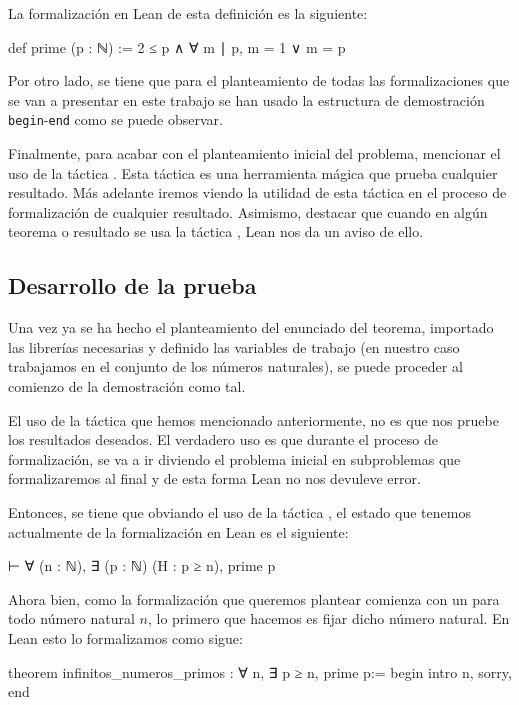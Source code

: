 La formalización en Lean de esta definición es la siguiente:
\begin{leancode}
def prime (p : ℕ) := 2 ≤ p ∧ ∀ m ∣ p, m = 1 ∨ m = p
\end{leancode}

Por otro lado, se tiene que para el planteamiento de todas las formalizaciones
que se van a presentar en este trabajo se han usado la estructura de
demostración \texttt{begin}-\texttt{end} como se puede observar.

Finalmente, para acabar con el planteamiento inicial del problema, mencionar
el uso de la táctica . Esta táctica es una herramienta
mágica que prueba cualquier resultado. Más adelante iremos viendo la utilidad
de esta táctica en el proceso de formalización de cualquier resultado.
Asimismo, destacar que cuando en algún teorema o resultado se usa la táctica
, Lean nos da un aviso de ello.


\subsection{Desarrollo de la prueba}
Una vez ya se ha hecho el planteamiento del enunciado del teorema, importado
las librerías necesarias y definido las variables de trabajo (en nuestro caso
trabajamos en el conjunto de los números naturales), se puede proceder al
comienzo de la demostración como tal.

El uso de la táctica  que hemos mencionado anteriormente,
no es que nos pruebe los resultados deseados. El verdadero uso es que durante
el proceso de formalización, se va a ir diviendo el problema inicial en
subproblemas que formalizaremos al final y de esta forma Lean no nos devuleve
error.

Entonces, se tiene que obviando el uso de la táctica , el
estado que tenemos actualmente de la formalización en Lean es el siguiente:
\begin{leancode}
⊢ ∀ (n : ℕ), ∃ (p : ℕ) (H : p ≥ n), prime p
\end{leancode}

Ahora bien, como la formalización que queremos plantear comienza con un para
todo número natural \(n\), lo primero que hacemos es fijar dicho número
natural. En Lean esto lo formalizamos como sigue:
\begin{leancode}
theorem infinitos_numeros_primos : ∀ n, ∃ p ≥ n, prime p:=
begin
  intro n,
  sorry,
end
\end{leancode}

